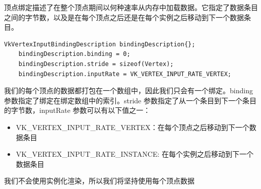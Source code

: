 \documentclass{ctexart}
\begin{document}
顶点绑定描述了在整个顶点期间以何种速率从内存中加载数据。它指定了数据条目之间的字节数，以及是在每个顶点之后还是在每个实例之后移动到下一个数据条目。
\begin{lstlisting}[language={[ANSI]C}]
	VkVertexInputBindingDescription bindingDescription{};
	bindingDescription.binding = 0;
	bindingDescription.stride = sizeof(Vertex);
	bindingDescription.inputRate = VK_VERTEX_INPUT_RATE_VERTEX;	
\end{lstlisting}

我们的每个顶点的数据都打包在一个数组中，因此我们只会有一个绑定。binding 参数指定了绑定在绑定数组中的索引。stride 参数指定了从一个条目到下一个条目的字节数，inputRate 参数可以有以下值之一：
\begin{itemize}
	\item VK\_VERTEX\_INPUT\_RATE\_VERTEX：在每个顶点之后移动到下一个数据条目
	\item VK\_VERTEX\_INPUT\_RATE\_INSTANCE: 在每个实例之后移动到下一个数据条目
\end{itemize}
我们不会使用实例化渲染，所以我们将坚持使用每个顶点数据
\end{document}
